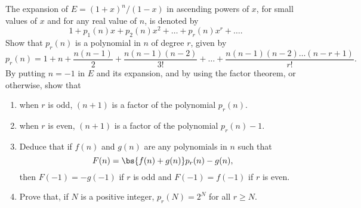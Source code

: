 \begin{problem}
    The expansion of $E = (1 + x)^n/(1-x)$ in ascending powers of $x$, for small values of $x$ and for any real value of $n$, is denoted by \[1 + p_1(n) x + p_2(n) x^2 + \dots + p_r(n) x^r + \dots.\] Show that $p_r(n)$ is a polynomial in $n$ of degree $r$, given by \[p_r(n) = 1 + n + \frac{n(n-1)}{2} + \frac{n(n-1)(n-2)}{3!} + \dots + \frac{n(n-1)(n-2)\dots(n-r+1)}{r!}.\] By putting $n = -1$ in $E$ and its expansion, and by using the factor theorem, or otherwise, show that
    \begin{enumerate}
        \item when $r$ is odd, $(n+1)$ is a factor of the polynomial $p_r(n)$.
        \item when $r$ is even, $(n+1)$ is a factor of the polynomial $p_r(n) - 1$.
        \item Deduce that if $f(n)$ and $g(n)$ are any polynomials in $n$ such that \[F(n) = \bs{f(n) + g(n)} p_r(n) - g(n),\] then $F(-1) = -g(-1)$ if $r$ is odd and $F(-1) = f(-1)$ if $r$ is even.
        \item Prove that, if $N$ is a positive integer, $p_r(N) = 2^N$ for all $r \geq N$.
    \end{enumerate}
\end{problem}
